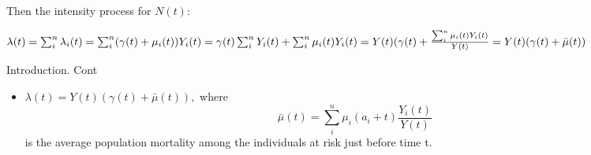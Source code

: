 \documentclass{beamer}
\begin{document}
 \begin{frame}
Then the intensity process for $N(t)$:
\newline

 $\lambda(t) = \sum_i^n \lambda_i(t) = \sum_i^n (\gamma(t) + \mu_i(t)) Y_i(t) \\
 
 = \gamma(t)\sum_i^n Y_i(t) + \sum_i^n \mu_i(t) Y_i(t) = Y(t) (\gamma(t) + \frac{\sum_i^n \mu_i(t) Y_i(t)}{Y(t)} \\
    
    
     = Y(t) (\gamma(t) + \bar\mu(t))$
 
  \end{frame}
  
  \begin{frame}{Introduction. Cont}
  \begin{itemize}
      \item $\lambda(t) = Y(t) (\gamma(t) + \bar\mu(t)),$ 
      where 
     \begin{equation}
     \label{eq1}
     \bar\mu(t) = \sum_i^n \mu_i(a_i+t) \frac{Y_i(t)}{Y(t)}
     \end{equation}
   \newline
     is the average population mortality among the individuals at risk just before time t.
   \end{itemize}
\end{frame}

\end{document}
